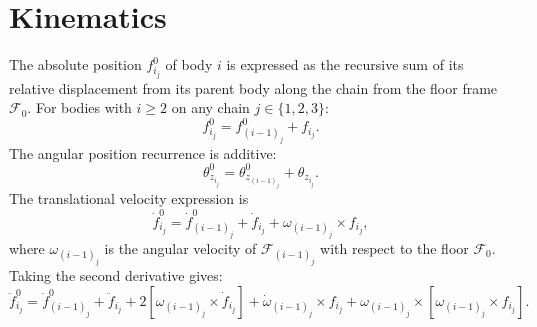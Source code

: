 \documentclass[11pt,letterpaper]{article}
\begin{document}
\section*{Kinematics}

The absolute position $f^{0}_{i_j}$ of body $i$ is expressed as the recursive sum of its relative displacement from its parent body along the chain from the floor frame $\mathcal{F}_{0}$. For bodies with $i \geq 2$ on any chain $j \in \{1,2,3\}$:
\begin{equation}
    f^{0}_{i_j} = f^{0}_{(i-1)_j} + f_{i_j}.
\end{equation}
The angular position recurrence is additive:
\begin{equation}
    \theta^{0}_{z_{i_j}} = \theta^{0}_{z_{(i-1)_j}} + \theta_{z_{i_j}}.
\end{equation}
The translational velocity expression is
\begin{equation}
    \dot{f}^{0}_{i_j} = \dot{f}^{0}_{(i-1)_j} + \dot{f}_{i_j} + \omega_{(i-1)_j} \times f_{i_j},
\end{equation}
where $\omega_{(i-1)_j}$ is the angular velocity of $\mathcal{F}_{(i-1)_j}$ with respect to the floor $\mathcal{F}_{0}$. Taking the second derivative gives:
\begin{equation}
    \ddot{f}^{0}_{i_j} = \ddot{f}^{0}_{(i-1)_j} + \ddot{f}_{i_j}
    + 2\!\left[ \omega_{(i-1)_j} \times \dot{f}_{i_j} \right]
    + \dot{\omega}_{(i-1)_j} \times f_{i_j}
    + \omega_{(i-1)_j} \times \!\left[ \omega_{(i-1)_j} \times f_{i_j} \right].
\end{equation}
\end{document}
